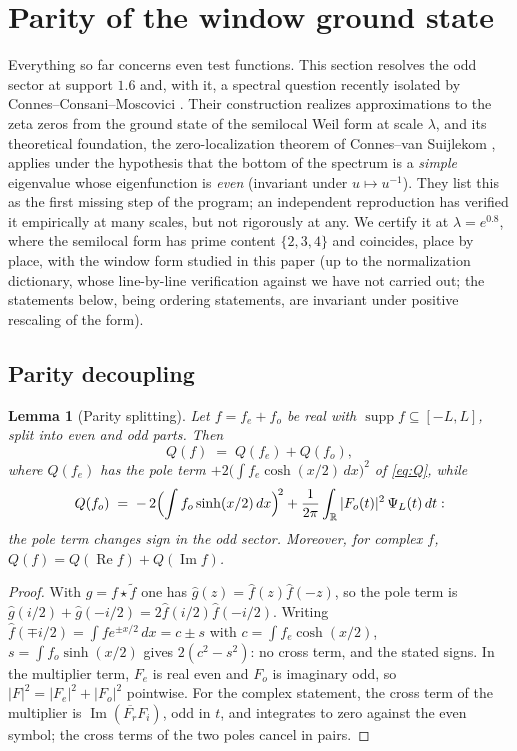 ﻿\documentclass[11pt]{article}
\newtheorem{lemma}[theorem]{Lemma}
\newcommand{\R}{\mathbb{R}}
\newcommand{\supp}{\operatorname{supp}}
\newcommand{\Rey}{\operatorname{Re}}
\begin{document}
\section{Parity of the window ground state}\label{sec:parity}

Everything so far concerns even test functions.  This section resolves
the odd sector at support $1.6$ and, with it, a spectral question
recently isolated by Connes--Consani--Moscovici \cite{CCMZeta2025}.
Their construction realizes approximations to the zeta zeros from the
ground state of the semilocal Weil form at scale $\lambda$, and its
theoretical foundation, the zero-localization theorem of
Connes--van Suijlekom \cite{ConnesVanSuijlekom2025}, applies under the
hypothesis that the bottom of the spectrum is a \emph{simple}
eigenvalue whose eigenfunction is \emph{even} (invariant under
$u\mapsto u^{-1}$).  They list this as the first missing step of the
program; an independent reproduction has verified it empirically at
many scales, but not rigorously at any.  We certify it at
$\lambda=e^{0.8}$, where the semilocal form has prime content
$\{2,3,4\}$ and coincides, place by place, with the window form
studied in this paper (up to the normalization dictionary, whose
line-by-line verification against \cite{CCMZeta2025} we have not
carried out; the statements below, being ordering statements, are
invariant under positive rescaling of the form).

\subsection{Parity decoupling}

\begin{lemma}[Parity splitting]\label{lem:parity}
Let $f=f_e+f_o$ be real with $\supp f\subseteq[-L,L]$, split into even
and odd parts.  Then
\[
Q(f)\;=\;Q(f_e)+Q(f_o),
\]
where $Q(f_e)$ has the pole term $+2\bigl(\int f_e\cosh(x/2)\,dx\bigr)^2$
of \eqref{eq:Q}, while
\[
Q(f_o)\;=\;-\,2\Bigl(\int f_o\sinh(x/2)\,dx\Bigr)^{\!2}
+\frac1{2\pi}\int_{\R}|F_o(t)|^2\,\Psi_L(t)\,dt :
\]
\emph{the pole term changes sign in the odd sector}.  Moreover, for
complex $f$, $Q(f)=Q(\Rey f)+Q(\operatorname{Im} f)$.
\end{lemma}

\begin{proof}
With $g=f\star\tilde f$ one has $\hat g(z)=\hat f(z)\hat f(-z)$, so the
pole term is $\hat g(i/2)+\hat g(-i/2)=2\hat f(i/2)\hat f(-i/2)$.
Writing $\hat f(\mp i/2)=\int f e^{\pm x/2}\,dx=c\pm s$ with
$c=\int f_e\cosh(x/2)$, $s=\int f_o\sinh(x/2)$ gives
$2(c^2-s^2)$: no cross term, and the stated signs.  In the multiplier
term, $F_e$ is real even and $F_o$ is imaginary odd, so
$|F|^2=|F_e|^2+|F_o|^2$ pointwise.  For the complex statement, the
cross term of the multiplier is $\operatorname{Im}(\overline{F_r}F_i)$, odd in $t$,
and integrates to zero against the even symbol; the cross terms of the
two poles cancel in pairs.
\end{proof}
\end{document}
